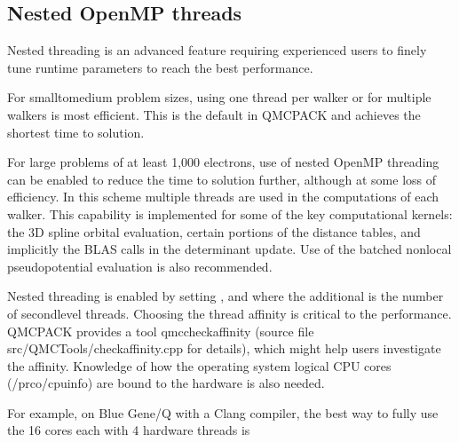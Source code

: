 \documentclass[letterpaper,10pt,english]{sphinxmanual}
\begin{document}
\subsection{Nested OpenMP threads}
\label{\detokenize{running:nested-openmp-threads}}
Nested threading is an advanced feature requiring experienced users to finely tune runtime parameters to reach the best performance.

For small\sphinxhyphen{}to\sphinxhyphen{}medium problem sizes, using one thread per walker or for multiple walkers is most efficient. This is the default in QMCPACK and achieves the shortest time to solution.

For large problems of at least 1,000 electrons, use of nested OpenMP threading can be enabled to reduce the time to solution further, although at some loss of efficiency. In this scheme multiple threads are used in the computations of each walker. This capability is implemented for some of the key computational kernels: the 3D spline orbital evaluation, certain portions of the distance tables, and implicitly the BLAS calls in the determinant update. Use of the batched nonlocal pseudopotential evaluation is also recommended.

Nested threading is enabled by setting ,  and  where the additional  is the number of second\sphinxhyphen{}level threads.  Choosing the thread affinity is critical to the performance.
QMCPACK provides a tool qmc\sphinxhyphen{}check\sphinxhyphen{}affinity (source file src/QMCTools/check\sphinxhyphen{}affinity.cpp for details), which might help users investigate the affinity. Knowledge of how the operating system logical CPU cores (/prco/cpuinfo) are bound to the hardware is also needed.

For example, on Blue Gene/Q with a Clang compiler, the best way to fully use the 16 cores each with 4 hardware threads is

\begin{sphinxVerbatim}[commandchars=\\\{\}]
\end{sphinxVerbatim}
\end{document}
